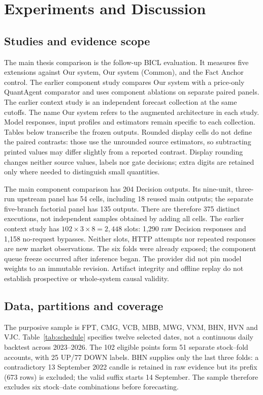 \chapter{Experiments and Discussion}\label{s:016253c474e8e6bb}
\section{Studies and evidence scope}\label{s:26fcfd1c2d723181}
The main thesis comparison is the follow-up BICL evaluation. It measures five extensions
against Our system, Our system (Common), and the Fact Anchor control. The
earlier component study compares Our system with a price-only QuantAgent
comparator and uses component ablations on separate paired panels. The earlier
context study is an independent forecast collection at the same cutoffs.
The name Our system refers to the augmented architecture in each study.
Model responses, input profiles and estimators remain specific to each
collection. Tables below transcribe the frozen outputs.
Rounded display cells do not define the paired contrasts: those use
the unrounded source estimators, so subtracting printed values may differ
slightly from a reported contrast. Display rounding changes neither source
values, labels nor gate decisions; extra digits are retained only where
needed to distinguish small quantities.

The main component comparison has 204 Decision outputs. Its nine-unit, three-run
upstream panel has 54 cells, including 18 reused main outputs; the separate
five-branch factorial panel has 135 outputs. There are therefore 375
distinct executions, not independent samples obtained by adding all cells.
The earlier context study has $102\times3\times8=2,448$ slots: 1,290 raw Decision responses
and 1,158 no-request bypasses. Neither slots, HTTP attempts nor repeated
responses are new market observations. The six folds were already exposed;
the component queue freeze occurred after inference began. The provider did not pin model weights to an immutable revision. Artifact integrity and offline
replay do not establish prospective or whole-system causal validity.

\section{Data, partitions and coverage}\label{s:8be41ee200674674}
The purposive sample is FPT, CMG, VCB, MBB, MWG, VNM, BHN, HVN and VJC.
Table~\ref{tab:schedule} specifies twelve selected dates, not a continuous
daily backtest across 2023--2026. The 102 eligible points form 51 separate
stock--fold accounts, with 25 UP/77 DOWN labels. BHN supplies only the
last three folds: a contradictory 13 September 2022 candle is retained
in raw evidence but its prefix (673 rows) is excluded; the valid suffix
starts 14 September. The sample therefore excludes six stock--date combinations before forecasting.

